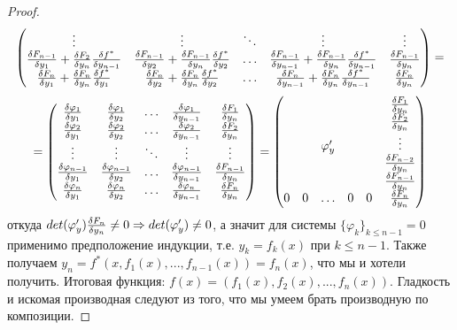 \documentclass[a4paper]{article}
\theoremstyle{indented}
\theoremstyle{definition}
\theoremstyle{remark}
\begin{document}
\begin{proof}
$$\begin{pmatrix}
        \vdots                                      & \vdots                                      &\ddots & \vdots                                              & \vdots      \\
        \frac{\delta F_{n-1}}{\delta y_1} + \frac{\delta F_2}{\delta y_n} \frac{\delta f^*}{\delta y_{n-1}}& \frac{\delta F_{n-1}}{\delta y_2} + \frac{\delta F_{n-1}}{\delta y_n} \frac{\delta f^*}{\delta y_2} &\ldots & \frac{\delta F_{n-1}}{\delta y_{n-1}}  + \frac{\delta F_{n-1}}{\delta y_n} \frac{\delta f^*}{\delta y_{n-1}} & \frac{\delta F_{n-1}}{\delta y_n}\\
        \frac{\delta F_n}{\delta y_1} + \frac{\delta F_n}{\delta y_n} \frac{\delta f^*}{\delta y_1} & \frac{\delta F_n}{\delta y_2} + \frac{\delta F_n}{\delta y_n} \frac{\delta f^*}{\delta y_2} &\ldots & \frac{\delta F_n}{\delta y_{n-1}} + \frac{\delta F_n}{\delta y_n} \frac{\delta f^*}{\delta y_{n-1}} & \frac{\delta F_n}{\delta y_n}
    \end{pmatrix}  = 
    $$
    $$
    =
    \begin{pmatrix}
        \frac{\delta \varphi_1}{\delta y_1} & \frac{\delta \varphi_1}{\delta y_2} &\ldots & \frac{\delta \varphi_1}{\delta y_{n-1}} & \frac{\delta F_1}{\delta y_n}\\
        \frac{\delta \varphi_2}{\delta y_1} & \frac{\delta \varphi_2}{\delta y_2} &\ldots & \frac{\delta \varphi_2}{\delta y_{n-1}} & \frac{\delta F_2}{\delta y_n}\\
        \vdots           & \vdots           &\ddots & \vdots               &  \vdots \\
        \frac{\delta \varphi_{n-1}}{\delta y_1} & \frac{\delta \varphi_{n-1}}{\delta y_2} &\ldots & \frac{\delta \varphi_{n-1}}{\delta y_{n-1}} & \frac{\delta F_{n-1}}{\delta y_n}\\
        \frac{\delta \varphi_n}{\delta y_1} & \frac{\delta \varphi_n}{\delta y_2} &\ldots & \frac{\delta \varphi_n}{\delta y_{n-1}} & \frac{\delta F_n}{\delta y_n}\\
    \end{pmatrix} 
    =
    \begin{pmatrix}
          &   &        &   &   & \frac{\delta F_1}{\delta y_n}    \\
          &   &        &   &   & \frac{\delta F_2}{\delta y_n}    \\
          &   &\varphi'_y &   &   & \vdots           \\
          &   &        &   &   & \frac{\delta F_{n-2}}{\delta y_n}\\
          &   &        &   &   & \frac{\delta F_{n-1}}{\delta y_n}\\
        0 & 0 & \ldots & 0 & 0 & \frac{\delta F_n}{\delta y_n}
    \end{pmatrix} 
    $$
    откуда $det(\varphi'_y) \frac{\delta F_n}{\delta y_n} \not= 0 \Rightarrow det(\varphi'_y) \not= 0$, а значит для системы $\{\varphi_k\}_{k\leq n-1}=0$ применимо предположение индукции, т.е. $y_k = f_k(x)$ при $k \leq n-1$.
    Также получаем $y_n=f^*(x, f_1(x), ... , f_{n-1}(x))=f_n(x)$, что мы и хотели получить. Итоговая функция: $f(x)=(f_1(x), f_2(x), ... , f_n(x))$. Гладкость и искомая производная следуют из того, что мы умеем брать
    производную по композиции.  
\end{proof}
\end{document}
